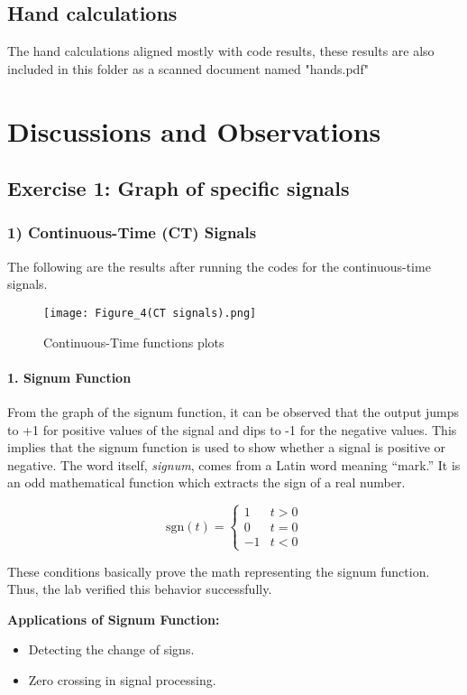 \documentclass[10pt, twocolumn]{article}
\begin{document}
\subsection{Hand calculations}
The hand calculations aligned mostly with code results, these results are also included in this folder as a scanned document named "hands.pdf"


\section{Discussions and Observations}

\subsection{Exercise 1: Graph of specific signals}

\subsubsection{1) Continuous-Time (CT) Signals}
The following are the results after running the codes for the continuous-time signals.
\begin{figure}[h]
    \centering
    \texttt{[image: Figure\_4(CT signals).png]}
    \caption{Continuous-Time functions plots}
    \label{fig:signum}
\end{figure}

\paragraph{1. Signum Function}
From the graph of the signum function, it can be observed that the output jumps to +1 for positive values of the signal and dips to -1 for the negative values. This implies that the signum function is used to show whether a signal is positive or negative. The word itself, \textit{signum}, comes from a Latin word meaning “mark.” It is an odd mathematical function which extracts the sign of a real number.

\[
\text{sgn}(t) = 
\begin{cases}
1 & t > 0 \\
0 & t = 0 \\
-1 & t < 0
\end{cases}
\]

These conditions basically prove the math representing the signum function. Thus, the lab verified this behavior successfully.

\textbf{Applications of Signum Function:}
\begin{itemize}
    \item Detecting the change of signs.
    \item Zero crossing in signal processing.
\end{itemize}
\end{document}
